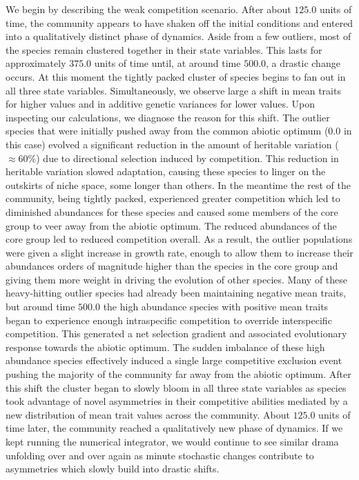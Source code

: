 \documentclass[]{elsarticle} %
\begin{document}
We begin by describing the weak competition scenario. After about
\(125.0\) units of time, the community appears to have shaken off the
initial conditions and entered into a qualitatively distinct phase of
dynamics. Aside from a few outliers, most of the species remain
clustered together in their state variables. This lasts for
approximately \(375.0\) units of time until, at around time \(500.0\), a
drastic change occurs. At this moment the tightly packed cluster of
species begins to fan out in all three state variables. Simultaneously,
we observe large a shift in mean traits for higher values and in
additive genetic variances for lower values. Upon inspecting our
calculations, we diagnose the reason for this shift. The outlier species
that were initially pushed away from the common abiotic optimum (\(0.0\)
in this case) evolved a significant reduction in the amount of heritable
variation (\(\approx60\%\)) due to directional selection induced by
competition. This reduction in heritable variation slowed adaptation,
causing these species to linger on the outskirts of niche space, some
longer than others. In the meantime the rest of the community, being
tightly packed, experienced greater competition which led to diminished
abundances for these species and caused some members of the core group
to veer away from the abiotic optimum. The reduced abundances of the
core group led to reduced competition overall. As a result, the outlier
populations were given a slight increase in growth rate, enough to allow
them to increase their abundances orders of magnitude higher than the
species in the core group and giving them more weight in driving the
evolution of other species. Many of these heavy-hitting outlier species
had already been maintaining negative mean traits, but around time
\(500.0\) the high abundance species with positive mean traits began to
experience enough intraspecific competition to override interspecific
competition. This generated a net selection gradient and associated
evolutionary response towards the abiotic optimum. The sudden imbalance
of these high abundance species effectively induced a single large
competitive exclusion event pushing the majority of the community far
away from the abiotic optimum. After this shift the cluster began to
slowly bloom in all three state variables as species took advantage of
novel asymmetries in their competitive abilities mediated by a new
distribution of mean trait values across the community. About \(125.0\)
units of time later, the community reached a qualitatively new phase of
dynamics. If we kept running the numerical integrator, we would continue
to see similar drama unfolding over and over again as minute stochastic
changes contribute to asymmetries which slowly build into drastic
shifts.
\end{document}
